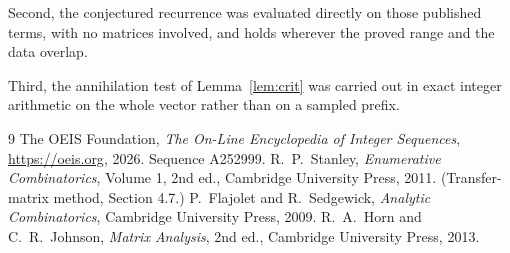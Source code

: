 \documentclass[11pt,a4paper]{article}
\theoremstyle{plain}
\theoremstyle{definition}
\begin{document}
Second, the conjectured recurrence was evaluated directly on those published terms, with no
matrices involved, and holds wherever the proved range and the data overlap.

Third, the annihilation test of Lemma~\ref{lem:crit} was carried out in exact integer
arithmetic on the whole vector rather than on a sampled prefix.

\begin{thebibliography}{9}
 The OEIS Foundation, \emph{The On-Line Encyclopedia of Integer
Sequences}, \url{https://oeis.org}, 2026. Sequence A252999.
 R.~P.~Stanley, \emph{Enumerative Combinatorics}, Volume 1, 2nd ed.,
Cambridge University Press, 2011. (Transfer-matrix method, Section 4.7.)
 P.~Flajolet and R.~Sedgewick, \emph{Analytic Combinatorics}, Cambridge
University Press, 2009.
 R.~A.~Horn and C.~R.~Johnson, \emph{Matrix Analysis}, 2nd ed., Cambridge
University Press, 2013.
\end{thebibliography}
\end{document}
